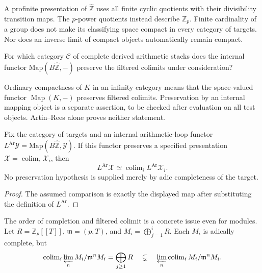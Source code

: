 A profinite presentation of \(\widehat{\mathbb Z}\) uses all finite
cyclic quotients with their divisibility transition maps.
The \(p\)-power quotients instead describe \(\mathbb Z_p\).
Finite cardinality of a group does not make its classifying space
compact in every category of targets. Nor does an inverse limit of
compact objects automatically remain compact.

\begin{question}
\label{v4-arith:w5-i:cor:b1-closure}
For which category \(\mathcal C\) of complete derived arithmetic
stacks does the internal functor
\(\mathrm{Map}(B\widehat{\mathbb Z},-)\) preserve the filtered
colimits under consideration?
\end{question}

Ordinary compactness of \(K\) in an infinity category means that the
space-valued functor \(\operatorname{Map}(K,-)\) preserves filtered
colimits. Preservation by an internal mapping object is a separate
assertion, to be checked after evaluation on all test objects.
Artin--Rees alone proves neither statement.

\begin{proposition}
\label{v4-arith:w5-i:thm:R1-formal-b-closes}
Fix the category of targets and an internal arithmetic-loop functor
\(L^{\mathrm{Ar}}\mathcal Y=
\mathrm{Map}(B\widehat{\mathbb Z},\mathcal Y)\).
If this functor preserves a specified presentation
\(\mathcal X=\operatorname{colim}_i\mathcal X_i\), then
\[
 L^{\mathrm{Ar}}\mathcal X
       \simeq\operatorname{colim}_iL^{\mathrm{Ar}}\mathcal X_i.
\]
No preservation hypothesis is supplied merely by adic completeness
of the target.
\end{proposition}
\begin{proof}
The assumed comparison is exactly the displayed map after substituting
the definition of \(L^{\mathrm{Ar}}\).
\end{proof}

The order of completion and filtered colimit is a concrete issue even
for modules. Let \(R=\mathbb Z_p[[T]]\), \(\mathfrak m=(p,T)\), and
\(M_i=\bigoplus_{j=1}^iR\). Each \(M_i\) is adically complete, but
\begin{equation}
 \operatorname{colim}_i\varprojlim_n M_i/\mathfrak m^nM_i
  =\bigoplus_{j\ge1}R
  \quad\subsetneq\quad
 \varprojlim_n\operatorname{colim}_i M_i/\mathfrak m^nM_i.
 \label{v4-arith:weil:eq:completion-counterexample}
\end{equation}

